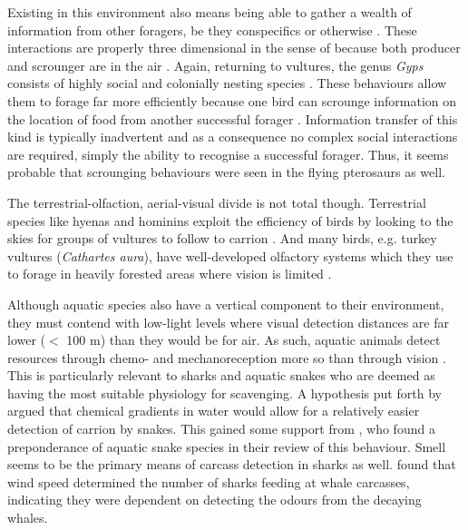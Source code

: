 \documentclass[a4paper,12pt]{article}
\begin{document}
Existing in this environment also means being able to gather a wealth of information from other foragers, be they conspecifics or otherwise \citep{jackson2008effect}.
These interactions are properly three dimensional in the sense of \cite{pawar2012dimensionality} because both producer and scrounger are in the air \citep{dall2005information}. 
Again, returning to vultures, the genus \textit{Gyps} consists of highly social and colonially nesting species \citep{fernandez2015density}.
These behaviours allow them to forage far more efficiently because one bird can scrounge information on the location of food from another successful forager \citep{KaneVul}.
Information transfer of this kind is typically inadvertent and as a consequence no complex social interactions are required, simply the ability to recognise a successful forager.
Thus, it seems probable that scrounging behaviours were seen in the flying pterosaurs as well. 

The terrestrial-olfaction, aerial-visual divide is not total though.
Terrestrial species like hyenas and hominins exploit the efficiency of birds by looking to the skies for groups of vultures to follow to carrion \citep{jones2015african,ruxton2013endurance}. 
And many birds, e.g. turkey vultures (\textit{Cathartes aura}), have well-developed olfactory systems \citep{AR:AR22815} which they use to forage in heavily forested areas where vision is limited \citep{houston1986olfaction}. 

Although aquatic species also have a vertical component to their environment, they must contend with low-light levels where visual detection distances are far lower ($<$ 100 m) than they would be for air.
As such, aquatic animals detect resources through chemo- and mechanoreception more so than through vision \citep{ruxton2004energetic}.
This is particularly relevant to sharks and aquatic snakes who are deemed as having the most suitable physiology for scavenging.
A hypothesis put forth by \cite{sazima1990necrofagia} argued that chemical gradients in water would allow for a relatively easier detection of carrion by snakes.
This gained some support from \cite{devault2002scavenging}, who found a preponderance of aquatic snake species in their review of this behaviour.
Smell seems to be the primary means of carcass detection in sharks as well. 
\cite{fallows2013white} found that wind speed determined the number of sharks feeding at whale carcasses, indicating they were dependent on detecting the odours from the decaying whales. 
\end{document}
